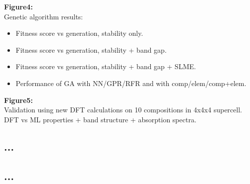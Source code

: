 \documentclass[]{revtex4-2}
\begin{document}
\textbf{Figure4:} \\
Genetic algorithm results: 
\begin{itemize}
\item Fitness score vs generation, stability only.
\item Fitness score vs generation, stability + band gap.
\item Fitness score vs generation, stability + band gap + SLME.
\item Performance of GA with NN/GPR/RFR and with comp/elem/comp+elem. \\
\end{itemize}

\textbf{Figure5:} \\
Validation using new DFT calculations on 10 compositions in 4x4x4 supercell. DFT vs ML properties + band structure + absorption spectra. \\


\subsection*{...}

\subsection*{...}
\end{document}
